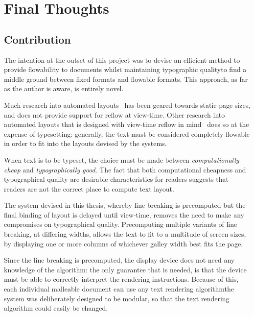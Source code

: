 \chapter{Final Thoughts}\label{ch:conclusions}

\section{Contribution}
The intention at the outset of this project was to devise an efficient method to provide flowability to documents whilst maintaining typographic quality\ed to find a middle ground between fixed formats and flowable formats. This approach, as far as the author is aware, is entirely novel.

Much research into automated layouts~\cite{Johari1996,Goldenberg2002,Purvis2003,Balinsky2009} has been geared towards static page sizes, and does not provide support for reflow at view-time. Other research into automated layouts that is designed with view-time reflow in mind~\cite{Jacobs2003,Schrier2008} does so at the expense of typesetting: generally, the text must be considered completely flowable in order to fit into the layouts devised by the systems.

When text is to be typeset, the choice must be made between \emph{computationally cheap} and \emph{typographically good}. The fact that both computational cheapness and typographical quality are desirable characteristics for \ebook{} readers suggests that \ebook{} readers are not the correct place to compute text layout.

The system devised in this thesis, whereby line breaking is precomputed but the final binding of layout is delayed until view-time, removes the need to make any compromises on typographical quality. Precomputing multiple variants of line breaking, at differing widths, allows the text to fit to a multitude of screen sizes, by displaying one or more columns of whichever galley width best fits the page.

Since the line breaking is precomputed, the display device does not need any knowledge of the algorithm: the only guarantee that is needed, is that the device must be able to correctly interpret the rendering instructions. Because of this, each individual malleable document can use any text rendering algorithm\ed the system was deliberately designed to be modular, so that the text rendering algorithm could easily be changed.



